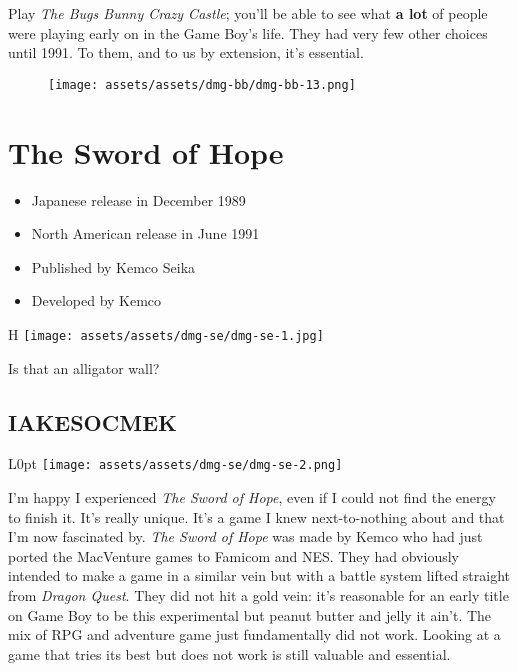 \documentclass{book}
\begin{document}
Play \emph{The Bugs Bunny Crazy Castle}; you’ll be able to see what \textbf{a lot} of people were playing early on in the Game Boy’s life. They had very few other choices until 1991. To them, and to us by extension, it’s essential.

\begin{figure}[hbt]
\vskip 10pt
\centering \texttt{[image: assets/assets/dmg-bb/dmg-bb-13.png]}
\vskip 6pt
\end{figure}


\begingroup \chapter*{The Sword of Hope} \endgroup

\begin{itemize} \setlength\itemsep{-0.4em}
\item Japanese release in December 1989
\item North American release in June 1991
\item Published by Kemco Seika
\item Developed by Kemco
\end{itemize}\noindent

\begin{wrapfigure}{H}{\linewidth}
\vskip 4pt
\centering \texttt{[image: assets/assets/dmg-se/dmg-se-1.jpg]}\par\pagetwodescription Is that an alligator wall?\end{wrapfigure}
\clearpage

\FloatBarrier\needspace{5pt}\section*{IAKESOCMEK}\nopagebreak[4]

\begin{wrapfigure}{L}{0pt} \texttt{[image: assets/assets/dmg-se/dmg-se-2.png]}\end{wrapfigure}
I’m happy I experienced \emph{The Sword of Hope}, even if I could not find the energy to finish it. It’s really unique. It’s a game I knew next-to-nothing about and that I’m now fascinated by. \emph{The Sword of Hope} was made by Kemco who had just ported the MacVenture games to Famicom and NES. They had obviously intended to make a game in a similar vein but with a battle system lifted straight from \emph{Dragon Quest}. They did not hit a gold vein: it’s reasonable for an early title on Game Boy to be this experimental but peanut butter and jelly it ain’t. The mix of RPG and adventure game just fundamentally did not work. Looking at a game that tries its best but does not work is still valuable and essential.
\end{document}
